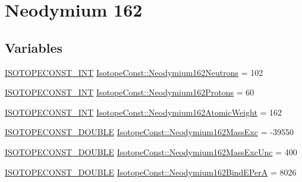 \hypertarget{group___isotope_const-_neodymium-_nd162}{}\section{Neodymium 162}
\label{group___isotope_const-_neodymium-_nd162}
\subsection*{Variables}
\begin{DoxyCompactItemize}
\item 
\mbox{\hyperlink{group___isotope_const-_macros_ga5f18360b3e99483a35c32d789e62621c}{I\+S\+O\+T\+O\+P\+E\+C\+O\+N\+S\+T\+\_\+\+I\+NT}} \mbox{\hyperlink{group___isotope_const-_neodymium-_nd162_ga2033a93e23453f3324ee4fdf358188d0}{Isotope\+Const\+::\+Neodymium162\+Neutrons}} = 102
\item 
\mbox{\hyperlink{group___isotope_const-_macros_ga5f18360b3e99483a35c32d789e62621c}{I\+S\+O\+T\+O\+P\+E\+C\+O\+N\+S\+T\+\_\+\+I\+NT}} \mbox{\hyperlink{group___isotope_const-_neodymium-_nd162_ga7295e8bb8ac6fa58e2876e30a73c8010}{Isotope\+Const\+::\+Neodymium162\+Protons}} = 60
\item 
\mbox{\hyperlink{group___isotope_const-_macros_ga5f18360b3e99483a35c32d789e62621c}{I\+S\+O\+T\+O\+P\+E\+C\+O\+N\+S\+T\+\_\+\+I\+NT}} \mbox{\hyperlink{group___isotope_const-_neodymium-_nd162_ga39670bafc6f70c34c99a5419473460e0}{Isotope\+Const\+::\+Neodymium162\+Atomic\+Weight}} = 162
\item 
\mbox{\hyperlink{group___isotope_const-_macros_ga8f45a7272ce02c0b4c65c44636ed719a}{I\+S\+O\+T\+O\+P\+E\+C\+O\+N\+S\+T\+\_\+\+D\+O\+U\+B\+LE}} \mbox{\hyperlink{group___isotope_const-_neodymium-_nd162_gae11170e13a18bb8c6502c165400966c9}{Isotope\+Const\+::\+Neodymium162\+Mass\+Exc}} = -\/39550
\item 
\mbox{\hyperlink{group___isotope_const-_macros_ga8f45a7272ce02c0b4c65c44636ed719a}{I\+S\+O\+T\+O\+P\+E\+C\+O\+N\+S\+T\+\_\+\+D\+O\+U\+B\+LE}} \mbox{\hyperlink{group___isotope_const-_neodymium-_nd162_gab92a3e6bdd35ee1390ad40319be98874}{Isotope\+Const\+::\+Neodymium162\+Mass\+Exc\+Unc}} = 400
\item 
\mbox{\hyperlink{group___isotope_const-_macros_ga8f45a7272ce02c0b4c65c44636ed719a}{I\+S\+O\+T\+O\+P\+E\+C\+O\+N\+S\+T\+\_\+\+D\+O\+U\+B\+LE}} \mbox{\hyperlink{group___isotope_const-_neodymium-_nd162_ga71ca92c60179e03999c485fc4ebc9f46}{Isotope\+Const\+::\+Neodymium162\+Bind\+E\+PerA}} = 8026
\item 

\end{DoxyCompactItemize}

